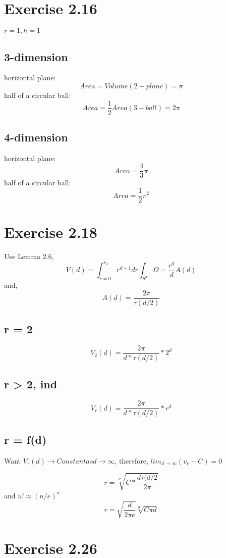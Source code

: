 \documentclass[paper=a4, fontsize=11pt]{scrartcl} %
\numberwithin{equation}{section} %
\numberwithin{figure}{section} %
\numberwithin{table}{section} %
\begin{document}
\section*{Exercise 2.16}

$r = 1, h = 1$

\subsection*{3-dimension}
horizontal plane:
$$ Area = Volume(2-plane) = \pi$$
half of a circular ball: 
$$ Area = \frac{1}{2} Area(3-ball) = 2\pi $$

\subsection*{4-dimension}
horizontal plane:
$$ Area = \frac{4}{3} \pi$$
half of a circular ball: 
$$ Area = \frac{1}{2} \pi^2 $$


\section*{Exercise 2.18}

Use Lemma 2.6, $$ V(d) = \int_{r=0}^{r_0} r^{d-1} dr \int_{S^d} \Omega = \frac{r^d}{d}A(d) $$
and, $$ A(d) = \frac{2 \pi}{\tau(d/2)} $$

\subsection*{r = 2}

$$ V_2(d) = \frac{2 \pi}{d*\tau(d/2)} * 2^d $$

\subsection*{r > 2, ind}

$$ V_r(d) = \frac{2 \pi}{d*\tau(d/2)} * r^d $$

\subsection*{r = f(d)}
Want $V_r(d) \rightarrow Constant as d \rightarrow \infty$, therefore,
$ lim_{d \rightarrow \infty} (v_r - C) = 0 $

$$ r = \sqrt[d]{ C*\frac{d \tau(d/2}{2 \pi} } $$
and $n! \approx (n / e)^n$
$$ r =  \sqrt{\frac{d}{2 \pi e}} \sqrt[d]{C \pi d} $$


\section*{Exercise 2.26}
\end{document}
